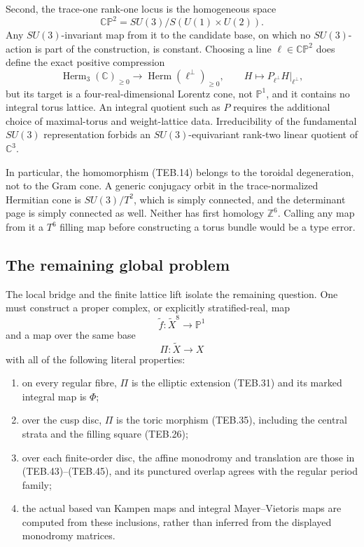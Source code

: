 Second, the trace-one rank-one locus is the homogeneous space
\[
 \mathbb{CP}^2=SU(3)/S(U(1)\times U(2)).
\]
Any \(SU(3)\)-invariant map from it to the candidate base, on which no
\(SU(3)\)-action is part of the construction, is constant.  Choosing a line
\(\ell\in\mathbb{CP}^2\) does define the exact positive compression
\[
 \operatorname{Herm}_3(\mathbb C)_{\ge0}\longrightarrow
 \operatorname{Herm}(\ell^\perp)_{\ge0},
 \qquad H\longmapsto P_{\ell^\perp}H|_{\ell^\perp},     \tag{TEB.53}
\]
but its target is a four-real-dimensional Lorentz cone, not
\(\mathbb P^1\), and it contains no integral torus lattice.  An integral
quotient such as \(P\) requires the additional choice of maximal-torus and
weight-lattice data.  Irreducibility of the fundamental \(SU(3)\)
representation forbids an \(SU(3)\)-equivariant rank-two linear quotient of
\(\mathbb C^3\).

In particular, the homomorphism (TEB.14) belongs to the toroidal degeneration,
not to the Gram cone.  A generic conjugacy orbit in the trace-normalized
Hermitian cone is \(SU(3)/T^2\), which is simply connected, and the determinant
page is simply connected as well.  Neither has first homology
\(\mathbb Z^6\).  Calling any map from it a \(T^6\) filling map before
constructing a torus bundle would be a type error.

\subsection{The remaining global problem}
\label{subsec:teb-remaining}

The local bridge and the finite lattice lift isolate the remaining question.
One must construct a proper complex, or explicitly stratified-real, map
\[
 \widetilde f:\widetilde X^8\longrightarrow\mathbb P^1
\]
and a map over the same base
\[
 \Pi:\widetilde X\longrightarrow X                              \tag{TEB.54}
\]
with all of the following literal properties:
\begin{enumerate}
\item on every regular fibre, \(\Pi\) is the elliptic extension (TEB.31) and
its marked integral map is \(\Phi\);
\item over the cusp disc, \(\Pi\) is the toric morphism (TEB.35), including
the central strata and the filling square (TEB.26);
\item over each finite-order disc, the affine monodromy and translation are
those in (TEB.43)--(TEB.45), and its punctured overlap agrees with the regular
period family;
\item the actual based van Kampen maps and integral Mayer--Vietoris maps are
computed from these inclusions, rather than inferred from the displayed
monodromy matrices.
\end{enumerate}

